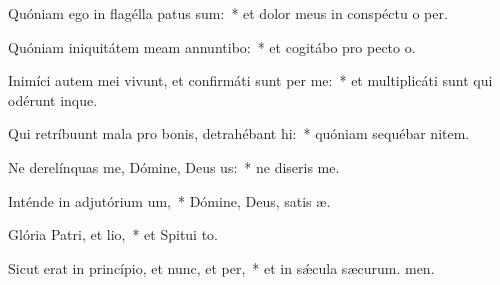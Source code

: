 \item Quóniam ego in flagélla patus sum:~* et dolor meus in conspéctu o per.
\item Quóniam iniquitátem meam annuntibo:~* et cogitábo pro pecto o.
\item Inimíci autem mei vivunt, et confirmáti sunt per me:~* et multiplicáti sunt qui odérunt  inque.
\item Qui retríbuunt mala pro bonis, detrahébant hi:~* quóniam sequébar nitem.
\item Ne derelínquas me, Dómine, Deus us:~* ne diseris  me.
\item Inténde in adjutórium um,~* Dómine, Deus, satis æ.
\item Glória Patri, et lio,~* et Spitui to.
\item Sicut erat in princípio, et nunc, et per,~* et in sǽcula sæcurum. men.
